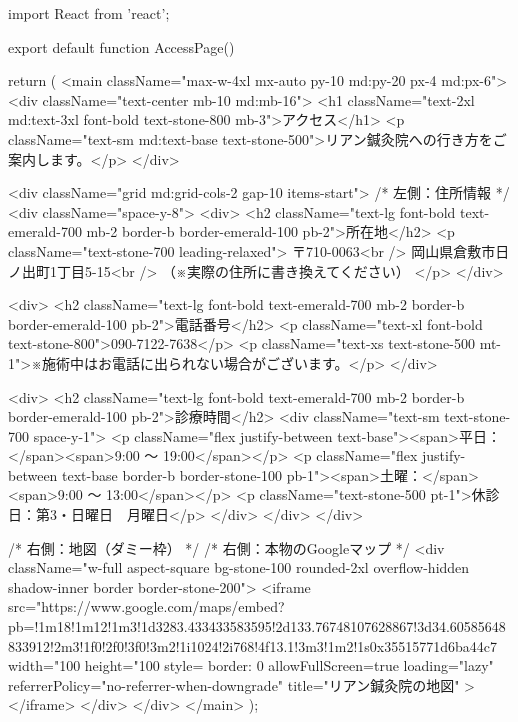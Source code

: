 import React from 'react';

export default function AccessPage() {
  return (
    <main className="max-w-4xl mx-auto py-10 md:py-20 px-4 md:px-6">
      <div className="text-center mb-10 md:mb-16">
        <h1 className="text-2xl md:text-3xl font-bold text-stone-800 mb-3">アクセス</h1>
        <p className="text-sm md:text-base text-stone-500">リアン鍼灸院への行き方をご案内します。</p>
      </div>

      <div className="grid md:grid-cols-2 gap-10 items-start">
        {/* 左側：住所情報 */}
        <div className="space-y-8">
          <div>
            <h2 className="text-lg font-bold text-emerald-700 mb-2 border-b border-emerald-100 pb-2">所在地</h2>
            <p className="text-stone-700 leading-relaxed">
              〒710-0063<br />
              岡山県倉敷市日ノ出町1丁目5-15<br />
              （※実際の住所に書き換えてください）
            </p>
          </div>

          <div>
            <h2 className="text-lg font-bold text-emerald-700 mb-2 border-b border-emerald-100 pb-2">電話番号</h2>
            <p className="text-xl font-bold text-stone-800">090-7122-7638</p>
            <p className="text-xs text-stone-500 mt-1">※施術中はお電話に出られない場合がございます。</p>
          </div>

          <div>
            <h2 className="text-lg font-bold text-emerald-700 mb-2 border-b border-emerald-100 pb-2">診療時間</h2>
            <div className="text-sm text-stone-700 space-y-1">
              <p className="flex justify-between text-base"><span>平日：</span><span>9:00 〜 19:00</span></p>
              <p className="flex justify-between text-base border-b border-stone-100 pb-1"><span>土曜：</span><span>9:00 〜 13:00</span></p>
              <p className="text-stone-500 pt-1">休診日：第3・日曜日　月曜日</p>
            </div>
          </div>
        </div>

        {/* 右側：地図（ダミー枠） */}
        {/* 右側：本物のGoogleマップ */}
<div className="w-full aspect-square bg-stone-100 rounded-2xl overflow-hidden shadow-inner border border-stone-200">
  <iframe
    src="https://www.google.com/maps/embed?pb=!1m18!1m12!1m3!1d3283.433433583595!2d133.76748107628867!3d34.60585648833912!2m3!1f0!2f0!3f0!3m2!1i1024!2i768!4f13.1!3m3!1m2!1s0x35515771d6ba44c7%
    width="100%
    height="100%
    style={{ border: 0 }}
    allowFullScreen={true}
    loading="lazy"
    referrerPolicy="no-referrer-when-downgrade"
    title="リアン鍼灸院の地図"
  ></iframe>
        </div>
      </div>
    </main>
  );
}